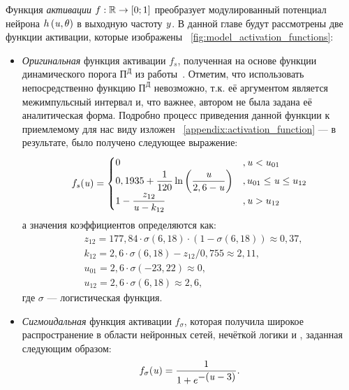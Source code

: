 Функция \textit{активации} $f: \mathbb{R} \to \left[0;1\right]$ преобразует модулированный потенциал нейрона $h\left( \mathit{u}, \theta \right)$ в выходную частоту $\mathit{y}$. В данной главе будут рассмотрены две функции активации, которые изображены \onfigure~\ref{fig:model_activation_functions}:
\begin{itemize}
	\item \textit{Оригинальная} функция активации $f_{s}$, полученная на основе функции динамического порога $\text{П}^\text{Д}$ из работы~\cite{EmelyanovYaroslavsky1990}. Отметим, что использовать непосредственно функцию $\text{П}^\text{Д}$ невозможно, т.к. её аргументом является межимпульсный интервал и, что важнее, автором не была задана её аналитическая форма. Подробно процесс приведения данной функции к приемлемому для нас виду изложен \inappendix~\ref{appendix:activation_function}  --- в результате, было получено следующее выражение:
		\begin{equation}
            \label{eq:activation_function_original}
            f_{s}(\mathit{u}) = 
            \begin{cases}
                0                                                                               &, \mathit{u} < u_{01} \\
                0,1935 + \dfrac{1}{120} \ln\left( \dfrac{\mathit{u}}{2,6 - \mathit{u}} \right)  &, u_{01} \le \mathit{u} \le u_{12} \\
                1 - \dfrac{z_{12}}{\mathit{u} - k_{12}}                                         &, \mathit{u} > u_{12} \\
            \end{cases}
		\end{equation}
        а значения коэффициентов определяются как:
        \begin{align*}
            &z_{12} = 177,84 \cdot \sigma\left(6,18\right) \cdot \left(1 - \sigma\left(6,18\right)\right) \approx 0,37, \\
            &k_{12} = 2,6 \cdot \sigma\left(6,18\right) - z_{12} / 0,755 \approx 2,11, \\
            &u_{01} = 2,6 \cdot \sigma\left(-23,22\right) \approx 0, \\
            &u_{12} = 2,6 \cdot \sigma\left(6,18\right) \approx 2,6,
        \end{align*}
        где $\sigma$ --- логистическая функция.
	\item \textit{Сигмоидальная} функция активации $f_{\sigma}$, которая получила широкое распространение в области нейронных сетей, нечёткой логики и \other, заданная следующим образом:
		\begin{equation}
            \label{eq:activation_function_sigma}
			f_{\sigma}(\mathit{u}) = \dfrac{1}{1 + e^{\displaystyle -(\mathit{u} - 3)}}.
		\end{equation}
\end{itemize}


